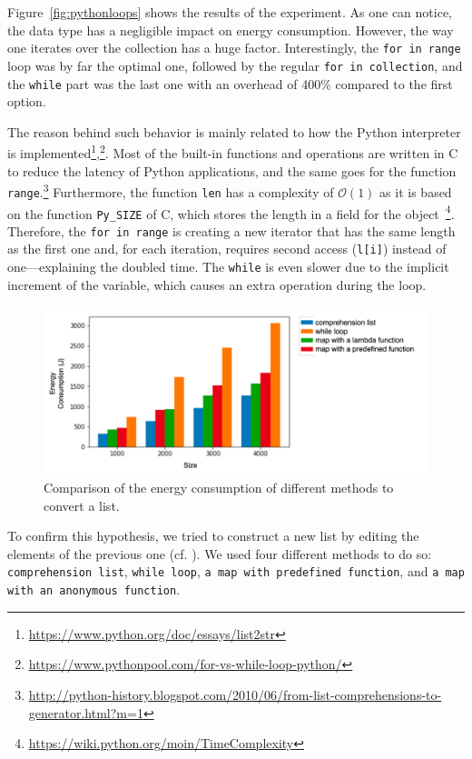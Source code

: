 Figure~\ref{fig:pythonloops} shows the results of the experiment. As one can notice, the data type has a negligible impact on energy consumption.
However, the way one iterates over the collection has a huge factor.
Interestingly, the \texttt{for in range} loop was by far the optimal one, followed by the regular \texttt{for in collection}, and the \texttt{while} part was the last one with an overhead of 400\% compared to the first option.

The reason behind such behavior is mainly related to how the Python interpreter is implemented\footnote{\url{https://www.python.org/doc/essays/list2str}},\footnote{\url{https://www.pythonpool.com/for-vs-while-loop-python/}}.
Most of the built-in functions and operations are written in C to reduce the latency of Python applications, and the same goes for the function \texttt{range}.\footnote{\url{ http://python-history.blogspot.com/2010/06/from-list-comprehensions-to-generator.html?m=1}}
Furthermore, the function \texttt{len} has a complexity of $\mathcal{O}(1)$ as it is based on the function \texttt{Py\_SIZE} of C, which stores the length in a field for the object~\footnote{\url{https://wiki.python.org/moin/TimeComplexity}}.
Therefore, the \texttt{for in range} is creating a new iterator that has the same length as the first one and, for each iteration, requires second access (\texttt{l[i]}) instead of one---explaining the doubled time.
The \texttt{while} is even slower due to the implicit increment of the variable, which causes an extra operation during the loop.

\begin{figure}
    \centering
    \includegraphics[width=\linewidth]{imgs/python_treatemens}
    \caption{Comparison of the energy consumption of different methods to convert a list.}
    \label{fig:pythontreatement}
\end{figure}


To confirm this hypothesis, we tried to construct a new list by editing the elements of the previous one (cf. ).
We used four different methods to do so: \texttt{comprehension list}, \texttt{while loop}, \texttt{a map with predefined function}, and \texttt{a map with an anonymous function}.

